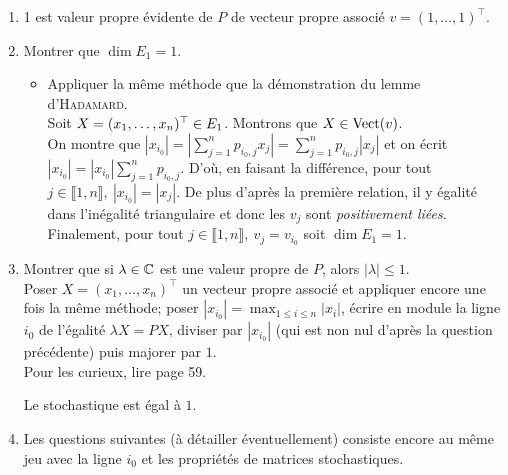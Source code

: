 \begin{solution}
    \begin{enumerate}
        \item 1 est valeur propre évidente de $P$ de vecteur propre associé $v = (1, \dots, 1)^\top$.
        \item Montrer que $\dim E_1 = 1$.
        \begin{itemize}
            \item Appliquer la même méthode que la démonstration du lemme d'\textsc{Hadamard}. \\
            Soit $X = (x_1, \dots, x_n)^\top \in E_1$. Montrons que $X \in \mathrm{Vect}(v)$. \\
            On montre que $|x_{i_0}| = \left| \sum\limits_{j=1}^{n} p_{i_0, j} x_j \right| = \sum\limits_{j=1}^{n} p_{i_0, j} |x_j|$ et on écrit $|x_{i_0}| = |x_{i_0}| \sum\limits_{j=1}^{n} p_{i_0, j}$. D'où, en faisant la différence, pour tout $j \in \llbracket 1, n \rrbracket,\ |x_{i_0}| = |x_j|$. De plus d'après la première relation, il y égalité dans l'inégalité triangulaire et donc les $v_j$ sont \emph{positivement liées}. Finalement, pour tout $j \in \llbracket1, n \rrbracket,\ v_j = v_{i_0}$ soit $\dim E_1 = 1$.
        \end{itemize}
        \item Montrer que si $\lambda \in \mathbb{C}$ est une valeur propre de $P$, alors $|\lambda| \leqslant 1$. \\
        Poser $X = (x_1, \dots, x_n)^\top$ un vecteur propre associé et appliquer encore une fois la même méthode; poser $\displaystyle |x_{i_0}|= \max_{1 \leqslant i \leqslant n} |x_i|$, écrire en module la ligne $i_0$ de l'égalité $\lambda X = P X$, diviser par $|x_{i_0}|$ (qui est non nul d'après la question précédente) puis majorer par $1$. \\
            
        Pour les curieux, lire \cite{matrices} page 59. 
        
        \begin{prop}{}
            Le  stochastique est égal à $1$.
        \end{prop}
    
        \item Les questions suivantes (à détailler éventuellement) consiste encore au même jeu avec la ligne $i_0$ et les propriétés de matrices stochastiques. 
    \end{enumerate}
\end{solution}
